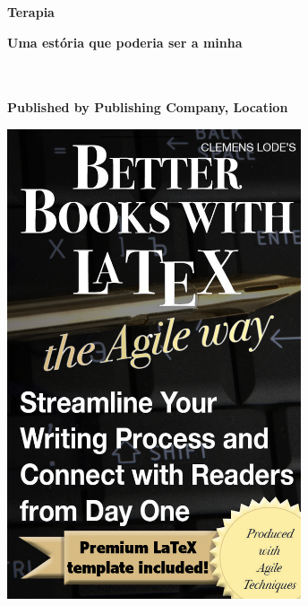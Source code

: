 \vspace{3cm}
  \begin{center}
	\bfseries \sffamily \Huge Terapia\par
	\bfseries \LARGE Uma estória que poderia ser a minha\par
~\\
	~\\
	\bfseries \small Published by Publishing Company, Location\par
	
    \ifxetex
		\includegraphics[width=0.65\textwidth]{images/cover_highres.png}
	\else

\end{center}
